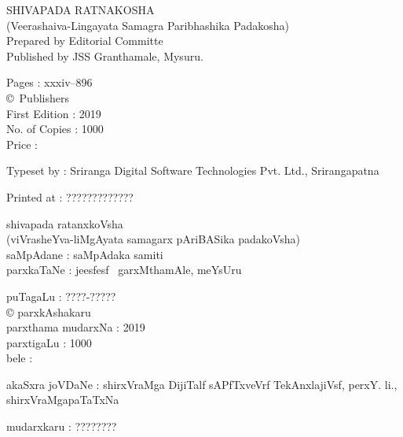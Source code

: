 \thispagestyle{empty}
\noindent
{\rm SHIVAPADA RATNAKOSHA}\\[5pt]
{\rm (Veerashaiva-Lingayata Samagra Paribhashika Padakosha)}\\[4pt]
{\rm Prepared by Editorial Committe}\\[4pt]
{\rm Published by JSS Granthamale, Mysuru.}

\vspace{1cm}

\noindent
{\rm Pages : xxxiv--896}\\[7pt]
{\rm \copyright \ Publishers}\\[7pt]
{\rm First Edition : 2019}\\[7pt]
{\rm No. of Copies : 1000}\\[7pt]
{\rm Price :} \rupee

\bigskip

\noindent
{\rm Typeset by : Sriranga Digital Software Technologies Pvt. Ltd., Srirangapatna}

\medskip

\noindent
{\rm Printed at : ?????????????}

\vfill

\noindent
{\large shivapada ratanxkoVsha}\\[5pt]
(viVrasheYva-liMgAyata samagarx pAriBASika padakoVsha)\\[5pt]
saMpAdane : saMpAdaka samiti\\[4pt]
parxkaTaNe : je{esf}{esf} \ garxMthamAle, meYsUru\\

\vspace{1cm}

\noindent
puTagaLu : ????-?????\\[3pt]
{\rm \copyright} parxkAshakaru\\[7pt]
parxthama mudarxNa : 2019\\[7pt]
parxtigaLu : 1000\\[10pt]
bele : \rupee

\bigskip

\noindent
akaSxra joVDaNe : shirxVraMga DijiTalf sAPfTxveVrf TekAnxlajiVsf, perxY. li., shirxVraMgapaTaTxNa

\medskip

\noindent
mudarxkaru : ????????

\newpage

\thispagestyle{empty}

\phantom{a}

\vfill

